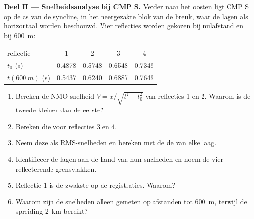 \begin{problem}
\noindent\textbf{Deel II --- Snelheidsanalyse bij CMP S.} Verder naar het oosten ligt CMP S
op de as van de syncline, in het neergezakte blok van de breuk, waar
de lagen als horizontaal worden beschouwd. Vier reflecties worden gekozen bij nulafstand en bij
\qty{600}{m}:
\begin{center}
\small
\begin{tabular}{lcccc}
\hline
reflectie & 1 & 2 & 3 & 4 \\
$t_0$ (\unit{s}) & 0.4878 & 0.5748 & 0.6548 & 0.7348 \\
$t(\qty{600}{m})$ (\unit{s}) & 0.5437 & 0.6240 & 0.6887 & 0.7648 \\
\hline
\end{tabular}
\end{center}
\begin{enumerate}[resume]
  \item Bereken de NMO-snelheid $V = x/\sqrt{t^2 - t_0^2}$ van reflecties 1
        en 2. Waarom is de tweede kleiner dan de eerste?
  \item Bereken die voor reflecties 3 en 4.
  \item Neem deze als RMS-snelheden en bereken met de
         de  van elke laag.
  \item Identificeer de lagen aan de hand van hun snelheden en noem de vier reflecterende
        grensvlakken.
  \item Reflectie 1 is de zwakste op de registraties. Waarom?
  \item Waarom zijn de snelheden alleen gemeten op afstanden tot \qty{600}{m},
        terwijl de spreiding \qty{2}{km} bereikt?
\end{enumerate}


\end{problem}
